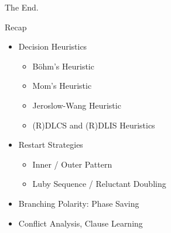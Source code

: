 \documentclass[t]{sdqbeamer2}
\begin{document}
\begin{frame}{The End.}
\begin{block}{Recap}
	\begin{itemize}\setlength{\itemsep}{1em}
		\item Decision Heuristics
		\begin{itemize}\setlength{\itemsep}{1ex}
			\item Böhm's Heuristic
			\item Mom's Heuristic
			\item Jeroslow-Wang Heuristic
			\item (R)DLCS and (R)DLIS Heuristics
		\end{itemize}
		\item Restart Strategies
		\begin{itemize}\setlength{\itemsep}{1ex}
			\item Inner / Outer Pattern
			\item Luby Sequence / Reluctant Doubling
		\end{itemize}
		\item Branching Polarity: Phase Saving
		\item Conflict Analysis, Clause Learning
	\end{itemize}
\end{block}
\end{frame}
\end{document}
